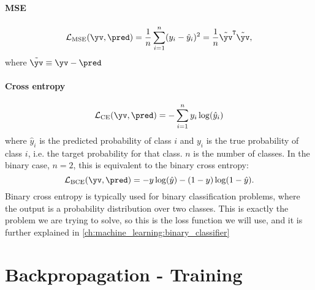     \subsection{}
        \paragraph{MSE}
            \begin{equation}\label{eq:ML:NN:loss:MSE}
                \mathcal{L}_\mathrm{MSE}(\yv, \pred) = \frac{1}{n}\sum_{i=1}^n(y_i-\hat{y}_i)^2 = \frac{1}{n}\tilde{\yv}^\mathtt{T}\tilde{\yv},
            \end{equation}
            where $\tilde{\yv} \equiv \yv-\pred$



        \paragraph{Cross entropy}
            \begin{equation}\label{eq:ML:NN:loss:cross_entropy}
                \mathcal{L}_\mathrm{CE}(\yv, \pred) = -\sum_{i=1}^n y_i\log(\hat{y}_i)
            \end{equation}
            where $\hat{y}_i$ is the predicted probability of class $i$ and $y_i$ is the true probability of class $i$, i.e. the target probability for that class. $n$ is the number of classes. In the binary case, $n=2$, this is equivalent to the binary cross entropy:
            \begin{equation}\label{eq:ML:NN:loss:binary_cross_entropy}
                \mathcal{L}_\mathrm{BCE}(\yv, \pred) = -y\log(\hat{y}) - (1-y)\log(1-\hat{y}).
            \end{equation}
            Binary cross entropy is typically used for binary classification problems, where the output is a probability distribution over two classes. This is exactly the problem we are trying to solve, so this is the loss function we will use, and it is further explained in \cref{ch:machine_learning:binary_classifier}

%
%
\section{Backpropagation - Training}
    \subsection{}
